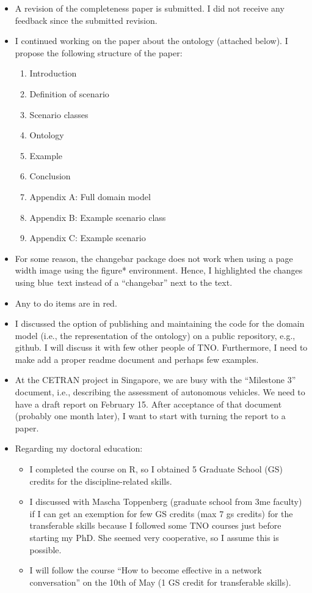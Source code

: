 \documentclass[10pt,final,a4paper,oneside,onecolumn]{article}
\begin{document}
\begin{itemize}
	\item A revision of the completeness paper is submitted. I did not receive any feedback since the submitted revision.
	\item I continued working on the paper about the ontology (attached below). I propose the following structure of the paper:
	\begin{enumerate}
		\item Introduction
		\item Definition of scenario
		\item Scenario classes
		\item Ontology
		\item Example
		\item Conclusion
		\item Appendix A: Full domain model
		\item Appendix B: Example scenario class
		\item Appendix C: Example scenario
	\end{enumerate}
	\item For some reason, the changebar package does not work when using a page width image using the figure* environment. Hence, I highlighted the changes using \color{blue}blue\color{black}\ text instead of a ``changebar'' next to the text.
	\item Any to do items are in \color{red}red\color{black}.
	\item I discussed the option of publishing and maintaining the code for the domain model (i.e., the representation of the ontology) on a public repository, e.g., github. I will discuss it with few other people of TNO. Furthermore, I need to make add a proper readme document and perhaps few examples.
	\item At the CETRAN project in Singapore, we are busy with the ``Milestone 3'' document, i.e., describing the assessment of autonomous vehicles. We need to have a draft report on February 15. After acceptance of that document (probably one month later), I want to start with turning the report to a paper.
	\item Regarding my doctoral education:
	\begin{itemize}	
		\item I completed the course on R, so I obtained 5 Graduate School (GS) credits for the discipline-related skills.
		\item I discussed with Mascha Toppenberg (graduate school from 3me faculty) if I can get an exemption for few GS credits (max 7 gs credits) for the transferable skills because I followed some TNO courses just before starting my PhD. She seemed very cooperative, so I assume this is possible.
		\item I will follow the course ``How to become effective in a network conversation'' on the 10th of May (1 GS credit for transferable skills).
	\end{itemize}
\end{itemize}
\end{document}
